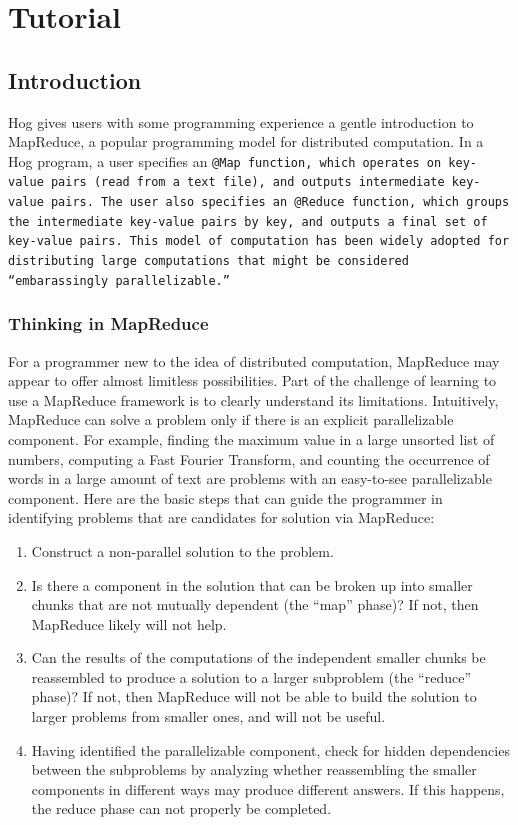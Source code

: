 \documentclass{report}
\begin{document}
\chapter{Tutorial}
\label{chap:tutor}

\section{Introduction}
\label{sec:introduction}

Hog gives users with some programming experience a gentle introduction to
MapReduce, a popular programming model for distributed computation. In a Hog
program, a user specifies an \tt @Map \rm function, which operates on key-value
pairs (read from a text file), and outputs intermediate key-value pairs. The user
also specifies an \tt @Reduce \rm function, which groups the intermediate key-value
pairs by key, and outputs a final set of key-value pairs. This model of computation
has been widely adopted for distributing large computations that might be
considered ``embarassingly parallelizable.''

\subsection{Thinking in MapReduce}
\label{sec:mapreduce_intro}
For a programmer new to the idea of distributed computation, MapReduce may appear to offer almost limitless possibilities. Part of the challenge of learning to use a MapReduce framework is to clearly understand its limitations. Intuitively, MapReduce can solve a problem only if there is an explicit parallelizable component. For example, finding the maximum value in a large unsorted list of numbers, computing a Fast Fourier Transform, and counting the occurrence of words in a large amount of text are problems with an easy-to-see parallelizable component. Here are the basic steps that can guide the programmer in identifying problems that are candidates for solution via MapReduce:
\begin{enumerate}
\item Construct a non-parallel solution to the problem.
\item Is there a component in the solution that can be broken up into smaller chunks that are not mutually dependent (the ``map'' phase)? If not, then MapReduce likely will not help.
\item Can the results of the computations of the independent smaller chunks be reassembled to produce a solution to a larger subproblem (the ``reduce'' phase)? If not, then MapReduce will not be able to build the solution to larger problems from smaller ones, and will not be useful.
\item Having identified the parallelizable component, check for hidden dependencies between the subproblems by analyzing whether reassembling the smaller components in different ways may produce different answers. If this happens, the reduce phase can not properly be completed.
\end{enumerate}
\end{document}
